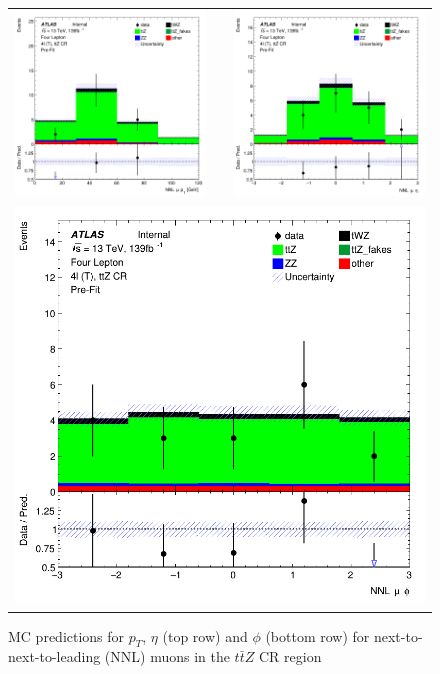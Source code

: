 \begin{figure}[htbp]
\centering
  \begin{tabular}{ccc}



    \includegraphics[width=.2\textwidth]{figures/PreFitPlots/lep4_ttZ_4T_NNL_mu_pt} & &
    \includegraphics[width=.2\textwidth]{figures/PreFitPlots/lep4_ttZ_4T_NNL_mu_eta}  \\
    \multicolumn{3}{c}{\includegraphics[width=.2\textwidth]{figures/PreFitPlots/lep4_ttZ_4T_NNL_mu_phi}}  \\
  \end{tabular}
    \caption{MC predictions for $p_{T}$, $\eta$ (top row) and $\phi$ (bottom row) for next-to-next-to-leading (NNL) muons in the $t\bar{t}Z$ CR region }
  \label{fig:4lep-ttZ-CR-muonPlots}
\end{figure}
\clearpage
